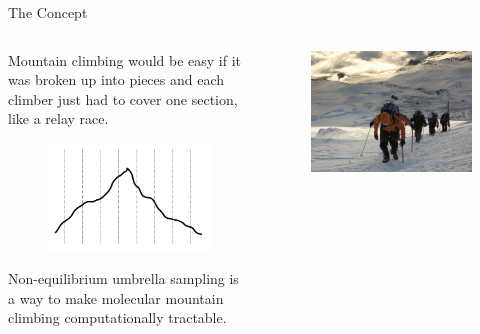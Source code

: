 \documentclass[final]{beamer}
\begin{document}
\begin{columns}[t]
\begin{column}{.33 \linewidth}
	\begin{block}{\Large The Concept}
            \begin{columns}[t]
                \begin{column}{.44\linewidth}
                    Mountain climbing would be easy if it was broken up into pieces and each climber just had to cover one section, like a relay race.
                    \begin{figure}
                        \includegraphics[scale=0.5]{images/mountain.pdf}
                    \end{figure}
                    Non-equilibrium umbrella sampling is a way to make molecular mountain climbing computationally tractable.
                \end{column}
                \begin{column}{.50\linewidth}
                    \begin{figure}
                        \includegraphics[scale=0.185]{images/DSCN4100.JPG}
                    \end{figure}
                \end{column}
            \end{columns}
	\end{block}


\end{column}
\end{columns}
\end{document}
